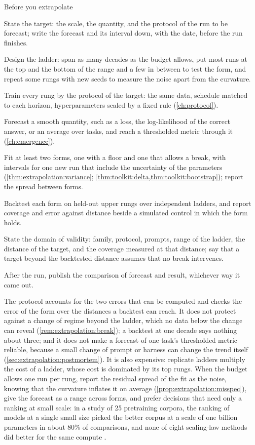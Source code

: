 \begin{refsection}
\begin{protocol}{Before you extrapolate}\label{prot:extrapolation:before}
\item State the target: the scale, the quantity, and the protocol of the run to be forecast; write the forecast and its interval down, with the date, before the run finishes.
\item Design the ladder: span as many decades as the budget allows, put most runs at the top and the bottom of the range and a few in between to test the form, and repeat some rungs with new seeds to measure the noise apart from the curvature.
\item Train every rung by the protocol of the target: the same data, schedule matched to each horizon, hyperparameters scaled by a fixed rule (\cref{ch:protocol}).
\item Forecast a smooth quantity, such as a loss, the log-likelihood of the correct answer, or an average over tasks, and reach a thresholded metric through it (\cref{ch:emergence}).
\item Fit at least two forms, one with a floor and one that allows a break, with intervals for one new run that include the uncertainty of the parameters (\cref{thm:extrapolation:variance}; \cref{thm:toolkit:delta,thm:toolkit:bootstrap}); report the spread between forms.
\item Backtest each form on held-out upper rungs over independent ladders, and report coverage and error against distance beside a simulated control in which the form holds.
\item State the domain of validity: family, protocol, prompts, range of the ladder, the distance of the target, and the coverage measured at that distance; say that a target beyond the backtested distance assumes that no break intervenes.
\item After the run, publish the comparison of forecast and result, whichever way it came out.
\end{protocol}

The protocol accounts for the two errors that can be computed and checks the error of the form over the distances a backtest can reach. It does not protect against a change of regime beyond the ladder, which no data below the change can reveal (\cref{rem:extrapolation:break}); a backtest at one decade says nothing about three; and it does not make a forecast of one task's thresholded metric reliable, because a small change of prompt or harness can change the trend itself (\cref{sec:extrapolation:postmortem}). It is also expensive: replicate ladders multiply the cost of a ladder, whose cost is dominated by its top rungs. When the budget allows one run per rung, report the residual spread of the fit as the noise, knowing that the curvature inflates it on average (\cref{prop:extrapolation:misspec}), give the forecast as a range across forms, and prefer decisions that need only a ranking at small scale: in a study of 25 pretraining corpora, the ranking of models at a single small size picked the better corpus at a scale of one billion parameters in about 80\% of comparisons, and none of eight scaling-law methods did better for the same compute \parencite{MagnussonEtAl2025}.


\end{refsection}

